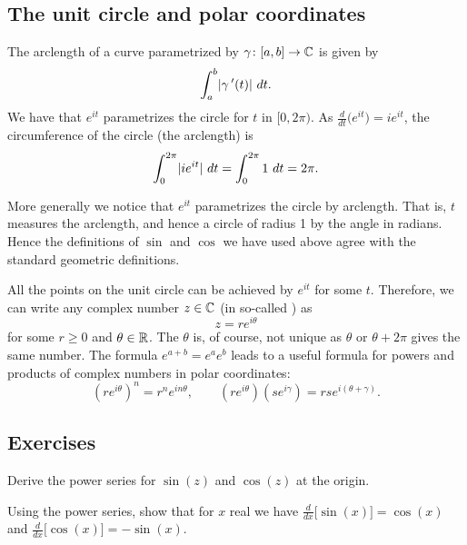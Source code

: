 \subsection{The unit circle and polar coordinates}

The arclength of a curve parametrized by $\gamma \colon [a,b] \to {\mathbb{C}}$ is given
by
\begin{equation*}
\int_a^b \lvert {\gamma^{\:\prime}(t)} \rvert ~ dt .
\end{equation*}
We have that $e^{it}$ parametrizes the circle for $t$ in $[0,2\pi)$.
As $\frac{d}{dt} \bigl( e^{it} \bigr) = ie^{it}$, the circumference of the
circle (the arclength) is
\begin{equation*}
\int_0^{2\pi} \lvert {i e^{it}} \rvert  ~  dt
=
\int_0^{2\pi} 1  ~  dt  = 2\pi .
\end{equation*}

More generally we notice that $e^{it}$ parametrizes the circle by arclength.
That is, $t$ measures the arclength, and hence a circle of radius 1 by
the angle in radians.  Hence the definitions of $\sin$ and $\cos$ we have
used above agree with the standard geometric definitions.

All the points on the unit circle can be achieved by
$e^{it}$ for some $t$.
Therefore,
we can write
any complex number $z \in {\mathbb{C}}$
(in so-called \emph{}) as
\begin{equation*}
z = r e^{i\theta}
\end{equation*}
for some $r \geq 0$ and $\theta \in {\mathbb{R}}$.  The $\theta$ is, of course,
not unique as $\theta$ or $\theta+2\pi$ gives the same number.
The formula $e^{a+b} = e^a e^b$ leads to a useful formula for powers
and products of complex numbers in polar coordinates:
\begin{equation*}
{(r e^{i\theta})}^n
= r^n e^{i n \theta} ,
\qquad
(r e^{i\theta})
(s e^{i\gamma})
=
rs e^{i(\theta+\gamma)} .
\end{equation*}

\subsection{Exercises}

\begin{exercise}
Derive the power series for $\sin(z)$ and $\cos(z)$ at the origin.
\end{exercise}

\begin{exercise}
Using the power series, show that for $x$ real we have
$\frac{d}{dx} \bigl[ \sin(x)\bigr] = \cos(x)$ and
$\frac{d}{dx} \bigl[ \cos(x)\bigr] = -\sin(x)$.
\end{exercise}

